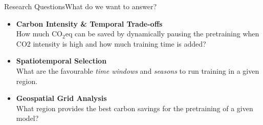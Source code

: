 \begin{frame}[t]{Research Questions}{What do we want to answer?}
  \begin{itemize}
    \item \textbf{Carbon Intensity \& Temporal Trade-offs}\\
      How much CO$_2$eq can be saved by dynamically pausing the
      pretraining when CO2 intensity is high and how much training
      time is added?
    \item \textbf{Spatiotemporal Selection}\\
      What are the favourable \emph{time windows} and \emph{seasons}
      to run training in a given region.
    \item \textbf{Geospatial Grid Analysis}\\
      What region provides the best carbon savings for the pretraining of a given model?  
  \end{itemize}

\end{frame}
